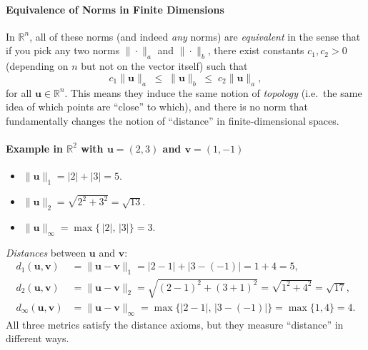\paragraph{Equivalence of Norms in Finite Dimensions}

\noindent
In $\mathbb{R}^n$, all of these norms (and indeed \emph{any} norms) are 
\emph{equivalent} in the sense that if you pick any two norms $\|\cdot\|_a$ and $\|\cdot\|_b$, 
there exist constants $c_1, c_2 > 0$ (depending on $n$ but not on the vector itself) such that
\[
  c_1 \|\mathbf{u}\|_a \;\le\; \|\mathbf{u}\|_b \;\le\; c_2 \|\mathbf{u}\|_a,
\]
for all $\mathbf{u} \in \mathbb{R}^n$. This means they induce the same notion of 
\emph{topology} (i.e.\ the same idea of which points are ``close'' to which), 
and there is no norm that fundamentally changes the notion of ``distance'' 
in finite-dimensional spaces.

\paragraph{Example in \(\mathbb{R}^2\) with \(\mathbf{u} = (2,3)\) and \(\mathbf{v}=(1,-1)\)}

\begin{itemize}
\item \(\|\mathbf{u}\|_1 = |2| + |3| = 5.\)
\item \(\|\mathbf{u}\|_2 
  = \sqrt{2^2 + 3^2} 
  = \sqrt{13}.\)
\item \(\|\mathbf{u}\|_\infty 
  = \max\{\,|2|,\,|3|\} 
  = 3.\)
\end{itemize}

\noindent
\emph{Distances} between $\mathbf{u}$ and $\mathbf{v}$:
\begin{align*}
d_1(\mathbf{u}, \mathbf{v}) 
&= \|\mathbf{u} - \mathbf{v}\|_1 
 = |2-1| + |3 - (-1)| 
 = 1 + 4 
 = 5,\\[6pt]
d_2(\mathbf{u}, \mathbf{v}) 
&= \|\mathbf{u} - \mathbf{v}\|_2 
 = \sqrt{(2-1)^2 + (3+1)^2} 
 = \sqrt{1^2 + 4^2} 
 = \sqrt{17},\\[6pt]
d_\infty(\mathbf{u}, \mathbf{v})
&= \|\mathbf{u} - \mathbf{v}\|_\infty 
 = \max\{|2-1|,\,|3 - (-1)|\}
 = \max\{1,4\}
 = 4.
\end{align*}
All three metrics satisfy the distance axioms, but they measure ``distance'' in different ways.



